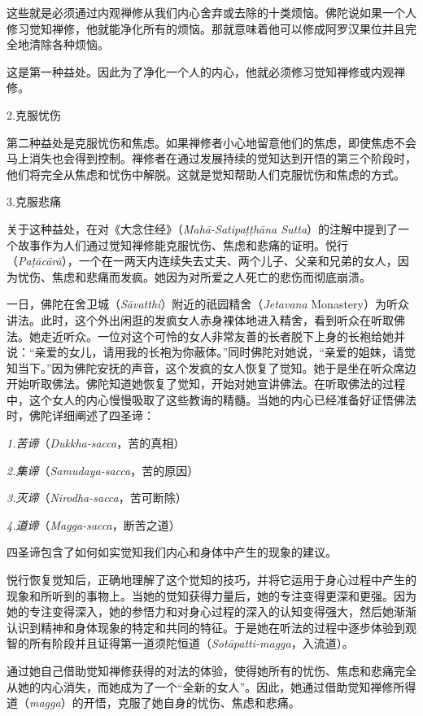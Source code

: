 这些就是必须通过内观禅修从我们内心舍弃或去除的十类烦恼。佛陀说如果一个人修习觉知禅修，他就能净化所有的烦恼。那就意味着他可以修成阿罗汉果位并且完全地清除各种烦恼。

这是第一种益处。因此为了净化一个人的内心，他就必须修习觉知禅修或内观禅修。

\sssubsectnon 2.克服忧伤

第二种益处是克服忧伤和焦虑。如果禅修者小心地留意他们的焦虑，即使焦虑不会马上消失也会得到控制。禅修者在通过发展持续的觉知达到开悟的第三个阶段时，他们将完全从焦虑和忧伤中解脱。这就是觉知帮助人们克服忧伤和焦虑的方式。

\sssubsectnon 3.克服悲痛

关于这种益处，在对《大念住经》（{\it Mah\=a-Satipa\d t\d th\=ana Sutta}）的注解中提到了一个故事作为人们通过觉知禅修能克服忧伤、焦虑和悲痛的证明。悦行（{\it Pa\d t\=ac\=ar\=a}），一个在一两天内连续失去丈夫、两个儿子、父亲和兄弟的女人，因为忧伤、焦虑和悲痛而发疯。她因为对所爱之人死亡的悲伤而彻底崩溃。

\1一日，佛陀在舍卫城（{\it S\=avatthi}）附近的祇园精舍（{\it Jetavana} Monastery）为听众讲法。此时，这个外出闲逛的发疯女人赤身裸体地进入精舍，看到听众在听取佛法。她走近听众。一位对这个可怜的女人非常友善的长者脱下上身的长袍给她并说：“亲爱的女儿，请用我的长袍为你蔽体。”同时佛陀对她说，“亲爱的姐妹，请觉知当下。”因为佛陀安抚的声音，这个发疯的女人恢复了觉知。她于是坐在听众席边开始听取佛法。佛陀知道她恢复了觉知，开始对她宣讲佛法。在听取佛法的过程中，这个女人的内心慢慢吸取了这些教诲的精髓。当她的内心已经准备好证悟佛法时，佛陀详细阐述了四圣谛：

\item{}{\it 1.苦谛}（{\it Dukkha-sacca}，苦的真相）
\item{}{\it 2.集谛}（{\it Samudaya-sacca}，苦的原因）
\item{}{\it 3.灭谛}（{\it Nirodha-sacca}，苦可断除）
\item{}{\it 4.道谛}（{\it Magga-sacca}，断苦之道）

四圣谛包含了如何如实觉知我们内心和身体中产生的现象的建议。

悦行恢复觉知后，正确地理解了这个觉知的技巧，并将它运用于身心过程中产生的现象和所听到的事物上。当她的觉知获得\1力量后，她的专注变得更深和更强。因为她的专注变得深入，她的参悟力和对身心过程的深入的认知变得强大，然后她渐渐认识到精神和身体现象的特定和共同的特征。于是她在听法的过程中逐步体验到观智的所有阶段并且证得第一道须陀恒道（{\it Sot\=apatti-magga}，入流道）。

通过她自己借助觉知禅修获得的对法的体验，使得她所有的忧伤、焦虑和悲痛完全从她的内心消失，而她成为了一个“全新的女人”。因此，她通过借助觉知禅修所得道（{\it magga}）的开悟，克服了她自身的忧伤、焦虑和悲痛。

